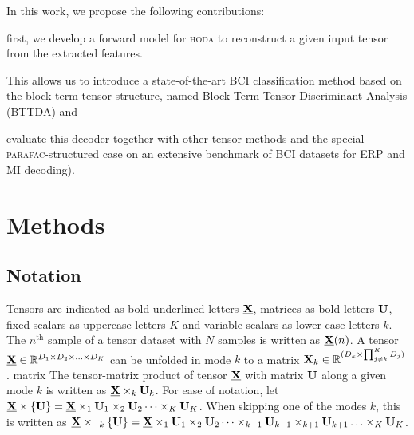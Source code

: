 \documentclass[twocolumn]{article}
\begin{document}

In this work, we propose the following contributions:
\begin{enumerate*}[label={\arabic*)}]
  \item first, we develop a forward model for \textsc{hoda} to reconstruct a
    given input tensor from the extracted features.
  \item This allows us to introduce a state-of-the-art BCI classification method based on the
    block-term tensor structure, named Block-Term Tensor Discriminant Analysis
    (\textsc{BTTDA}) and
  \item evaluate this decoder together with other tensor methods and the
    special \textsc{parafac}-structured case on an extensive benchmark of BCI
    datasets for ERP and MI decoding).
\end{enumerate*}

\section{Methods}

\subsection{Notation}
Tensors are indicated as bold underlined letters $\ten{X}$, matrices as bold
letters $\mat{U}$, fixed scalars as uppercase letters $K$ and variable
scalars as lower case letters $k$.
The $n^\text{th}$ sample of a tensor dataset with $N$ samples is written as
$\ten{X}(n)$.
A tensor $\ten{X}\in \mathbb{R}^{D_1\times D_2 \times \ldots \times D_K}$ can be unfolded in mode
$k$ to a matrix $\mat{X}_k\in\mathbb{R}^{(D_k\times\prod_{j\neq k}^K D_j)}$.
matrix
The tensor-matrix product of tensor $\ten{X}$ with matrix $\mat{U}$ along a
given mode $k$ is written as $\ten{X}\mpr{\mat{U}}{k}$. For ease of notation, let
$\ten{X}\mmpr{\mat{U}} =
	\ten{X}\mpr{\mat{U}}{1}\mpr{\mat{U}}{2}\cdots\mpr{\mat{U}}{K}$.
When skipping one of the modes $k$, this is
written as $\ten{X}\mmprs{\mat{U}}{k} =
	\ten{X}\mpr{\mat{U}}{1}\mpr{\mat{U}}{2}\cdots\mpr{\mat{U}}{k-1}\mpr{\mat{U}}{k+1}\ldots\mpr{\mat{U}}{K}$.
\end{document}
